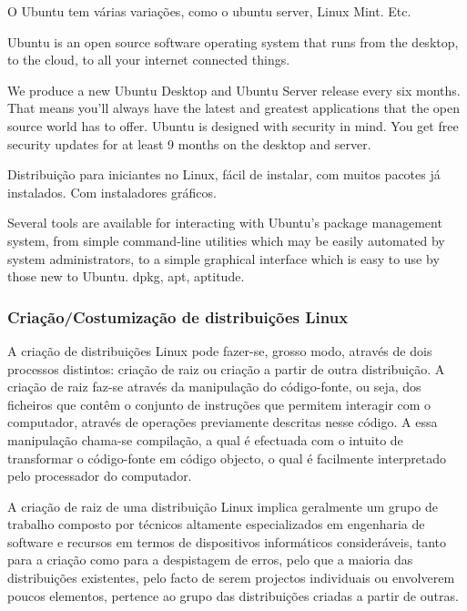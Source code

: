 \documentclass[
	article,			%
	12pt,				%
	openright,			%
	oneside,			%
	a4paper,			%
	chapter=TITLE,		%
	section=TITLE,		%
	subsection=TITLE,	%
	subsubsection=TITLE,%
	subsubsubsection=TITLE, %
	english,			%
	brazil,				%
	]{abntex2}
\begin{document}
\cite{FedoraProject2018b}


O Ubuntu tem várias variações, como o ubuntu server, Linux Mint. Etc.

Ubuntu is an open source software operating system that runs from the desktop, to the cloud, to all your internet connected things.

\cite{UbuntuFundation2018}

We produce a new Ubuntu Desktop and Ubuntu Server release every six months. That means you'll always have the latest and greatest applications that the open source world has to offer. Ubuntu is designed with security in mind. You get free security updates for at least 9 months on the desktop and server.

\cite{UbuntuWiki2017}

Distribuição para iniciantes no Linux, fácil de instalar, com muitos pacotes já instalados. Com instaladores gráficos.

Several tools are available for interacting with Ubuntu's package management system, from simple command-line utilities which may be easily automated by system administrators, to a simple graphical interface which is easy to use by those new to Ubuntu. dpkg, apt, aptitude.

\cite{UbuntuWiki2018}

\subsubsection{Criação/Costumização de distribuições Linux}

A criação de distribuições Linux pode fazer-se, grosso modo, através de dois processos distintos: criação de raiz ou criação a partir de outra distribuição. A criação de raiz faz-se através da manipulação do código-fonte, ou seja, dos ficheiros que contêm o conjunto de instruções que permitem interagir com o computador, através de operações previamente descritas nesse código. A essa manipulação chama-se compilação, a qual é efectuada com o intuito de transformar o código-fonte em código objecto, o qual é facilmente interpretado pelo processador do computador.

A criação de raiz de uma distribuição Linux implica geralmente um grupo de trabalho composto por técnicos altamente especializados em engenharia de software e recursos em termos de dispositivos informáticos consideráveis, tanto para a criação como para a despistagem de erros, pelo que a maioria das distribuições existentes, pelo facto de serem projectos individuais ou envolverem poucos elementos, pertence ao grupo das distribuições criadas a partir de outras.
\end{document}
